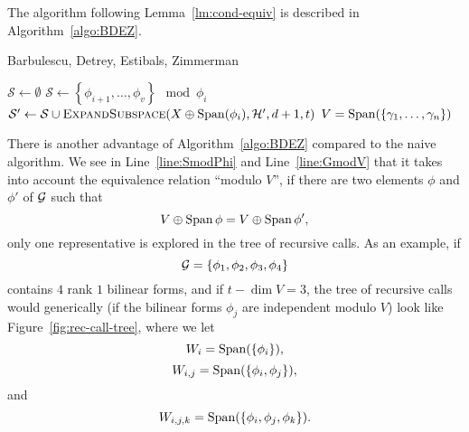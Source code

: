 The algorithm following Lemma~\ref{lm:cond-equiv} is described in
Algorithm~\ref{algo:BDEZ}.
\begin{algorithm}
  \caption{Barbulescu, Detrey, Estibals, Zimmerman}
  \label{algo:BDEZ}
  \begin{algorithmic}[1]

    \State {}
    \Else
    \State $\mathcal S\gets\emptyset$
      \State\label{line:SmodPhi} $\mathcal S\gets \left\{ \phi_{i+1}, \dots, \phi_v
  \right\}\mod\phi_i$
    \State $\mathcal S'\gets\mathcal
    S\cup\Call{ExpandSubspace}{X\oplus\Span(\phi_i), \mathcal H', d+1, t}$
    \EndFor
    \State {}
    \EndIf
    \EndFunction
    \State $V=\operatorname{Span}(\left\{ \gamma_1, \dots, \gamma_n \right\})$
    \State\label{line:GmodV} 
  \end{algorithmic}
\end{algorithm}
There is another advantage of Algorithm~\ref{algo:BDEZ} compared to the naive
algorithm. We see in Line~\ref{line:SmodPhi} and Line~\ref{line:GmodV} that it
takes into account the equivalence relation ``modulo $V$'', \ie if there are two
elements $\phi$ and $\phi'$ of $\mathcal{G}$ such that 
\[
  V\oplus\operatorname{Span}\phi=V\oplus\operatorname{Span}\phi',
\]
only one representative is explored in the tree of recursive calls. As an
example, if
\[
  \mathcal{G} = \left\{ \phi_1, \phi_2, \phi_3, \phi_4 \right\}
\]
contains $4$ rank $1$ bilinear forms, and if $t - \dim V = 3$, the tree of
recursive calls would generically (\eg if the bilinear forms $\phi_j$ are
independent modulo $V$) look like Figure~\ref{fig:rec-call-tree}, where we let
\[
  W_{i} = \operatorname{Span}(\left\{ \phi_i\right\}),
\]
\[
  W_{i, j} = \operatorname{Span}(\left\{ \phi_i, \phi_j\right\}),
\]
and
\[
  W_{i, j, k} = \operatorname{Span}(\left\{ \phi_i, \phi_j, \phi_k \right\}).
\]
